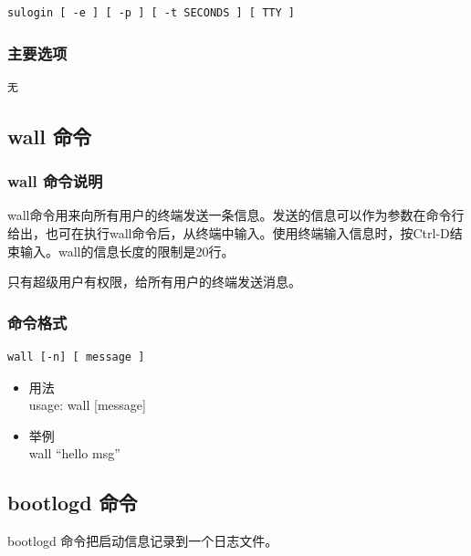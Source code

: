 {\begin{shaded}\begin{verbatim}
sulogin [ -e ] [ -p ] [ -t SECONDS ] [ TTY ]
\end{verbatim}\end{shaded}}
\subsubsection{主要选项}

{\begin{shaded}\begin{verbatim}
无
\end{verbatim}\end{shaded}}
\subsection{wall 命令}

\subsubsection{wall 命令说明}

wall命令用来向所有用户的终端发送一条信息。发送的信息可以作为参数在命令行给出，也可在执行wall命令后，从终端中输入。使用终端输入信息时，按Ctrl-D结束输入。wall的信息长度的限制是20行。

只有超级用户有权限，给所有用户的终端发送消息。

\subsubsection{命令格式}

{\begin{shaded}\begin{verbatim}
wall [-n] [ message ]
\end{verbatim}\end{shaded}}
\begin{itemize}
\item
  用法\\ usage: wall {[}message{]}
\item
  举例\\ wall ``hello msg''
\end{itemize}
\subsection{bootlogd 命令}

bootlogd 命令把启动信息记录到一个日志文件。


